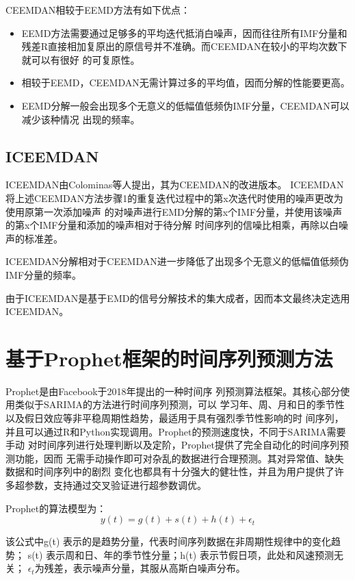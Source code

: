 \documentclass[AutoFakeBold]{LZUThesis}
\begin{document}
CEEMDAN相较于EEMD方法有如下优点：

\begin{itemize}
\item EEMD方法需要通过足够多的平均迭代抵消白噪声，因而往往所有IMF分量和
残差R直接相加复原出的原信号并不准确。而CEEMDAN在较小的平均次数下就可以有很好
的可复原性。
\item 相较于EEMD，CEEMDAN无需计算过多的平均值，因而分解的性能要更高。
\item EEMD分解一般会出现多个无意义的低幅值低频伪IMF分量，CEEMDAN可以减少该种情况
出现的频率。
\end{itemize}

\subsection{ICEEMDAN}

ICEEMDAN由Colominas等人提出，其为CEEMDAN的改进版本。
ICEEMDAN将上述CEEMDAN方法步骤1的重复迭代过程中的第x次迭代时使用的噪声更改为使用原第一次添加噪声
的对噪声进行EMD分解的第x个IMF分量，并使用该噪声的第x个IMF分量和添加的噪声相对于待分解
时间序列的信噪比相乘，再除以白噪声的标准差。

ICEEMDAN分解相对于CEEMDAN进一步降低了出现多个无意义的低幅值低频伪IMF分量的频率。

由于ICEEMDAN是基于EMD的信号分解技术的集大成者，因而本文最终决定选用ICEEMDAN。

\section{基于Prophet框架的时间序列预测方法}
Prophet是由Facebook于2018年提出的一种时间序
列预测算法框架。其核心部分使用类似于SARIMA的方法进行时间序列预测，可以
学习年、周、月和日的季节性以及假日效应等非平稳周期性趋势，最适用于具有强烈季节性影响的时
间序列，并且可以通过R和Python实现调用。Prophet的预测速度快，不同于SARIMA需要手动
对时间序列进行处理判断以及定阶，Prophet提供了完全自动化的时间序列预测功能，因而
无需手动操作即可对杂乱的数据进行合理预测。其对异常值、缺失数据和时间序列中的剧烈
变化也都具有十分强大的健壮性，并且为用户提供了许多超参数，支持通过交叉验证进行超参数调优。

Prophet的算法模型为：
$$y(t)=g(t)+s(t)+h(t)+\epsilon_t$$

该公式中g(t) 表示的是趋势分量，代表时间序列数据在非周期性规律中的变化趋势；
s(t) 表示周和日、年的季节性分量；h(t) 表示节假日项，此处和风速预测无关；
$\epsilon_{t}$为残差，表示噪声分量，其服从高斯白噪声分布。
\end{document}
